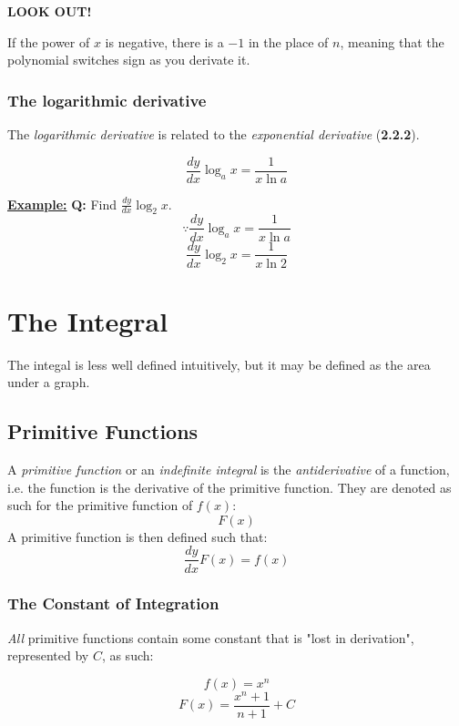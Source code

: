 \documentclass[12pt]{article}
\begin{document}
\textbf{LOOK OUT!}

If the power of $x$ is negative, there is a $-1$ in the place of $n$, meaning that the polynomial switches sign as you 
derivate it.

\subsubsection{The logarithmic derivative}

The \emph{logarithmic derivative} is related to the \emph{exponential derivative} (\textbf{2.2.2}). 

$$\frac{dy}{dx} \log_{a}x = \frac{1}{x \ln{a}}$$

\begin{BOX}

	\textbf{\underline{Example:}} \bigbreak
	\textbf{Q:} Find $\frac{dy}{dx}\log_2x$. \bigbreak
	$$\because \frac{dy}{dx}\log_ax = \frac{1}{x \ln{a}}$$
	$$\frac{dy}{dx} \log_2x = \frac{1}{x \ln{2}}$$


\end{BOX}
\newpage

\section{The Integral}

The integal is less well defined intuitively, but it may be defined as the area under a graph.

\subsection{Primitive Functions}

A \emph{primitive function} or an \emph{indefinite integral} is the \emph{antiderivative} of a function, i.e. the function is 
the derivative of the primitive function. They are denoted as such for the primitive function of $f(x)$: 
$$F(x)$$
\bigbreak
A primitive function is then defined such that: 
$$\frac{dy}{dx}F(x)=f(x)$$

\subsubsection{The Constant of Integration}

\emph{All} primitive functions contain some constant that is "lost in derivation", represented by $C$, as such:

$$f(x) = x^n$$
$$F(x) = \frac{x^n+1}{n+1} + C$$

\newpage
\end{document}

